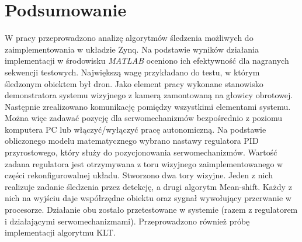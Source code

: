 \chapter{Podsumowanie}
\label{cha:podsumowanie}

W pracy przeprowadzono analizę algorytmów śledzenia możliwych do zaimplementowania w układzie Zynq. 
Na podstawie wyników działania implementacji w środowisku \textit{MATLAB} oceniono ich efektywność dla nagranych sekwencji testowych. 
Największą wagę przykładano do testu, w którym śledzonym obiektem był dron. 
Jako element pracy wykonane stanowisko demonstratora systemu wizyjnego z kamerą zamontowaną na głowicy obrotowej.
Następnie zrealizowano komunikację pomiędzy wszystkimi elementami systemu. 
Można więc zadawać pozycję dla serwomechanizmów bezpośrednio z poziomu komputera PC lub włączyć/wyłączyć pracę autonomiczną.
Na podstawie obliczonego modelu matematycznego wybrano nastawy regulatora PID przyrostowego, który służy do pozycjonowania serwomechanizmów. 
Wartość zadana regulatora jest otrzymywana z toru wizyjnego zaimplementowanego w części rekonfigurowalnej układu. 
Stworzono dwa tory wizyjne. 
Jeden z nich realizuje zadanie śledzenia przez detekcję, a drugi algorytm Mean-shift. 
Każdy z nich na wyjściu daje współrzędne obiektu oraz sygnał wywołujący przerwanie w procesorze. 
Działanie obu zostało przetestowane w systemie (razem z regulatorem i działającymi serwomechanizmami). 
Przeprowadzono również próbę implementacji algorytmu KLT.

